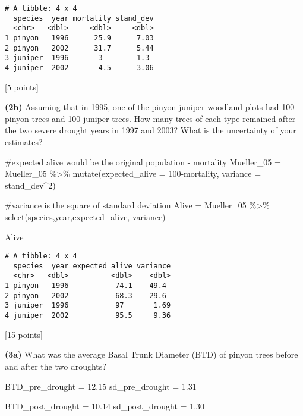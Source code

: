 \documentclass[
  letterpaper,
  DIV=11,
  numbers=noendperiod]{scrartcl}
\newenvironment{Shaded}{\begin{snugshade}}{\end{snugshade}}
\newcommand{\AttributeTok}[1]{\textcolor[rgb]{0.40,0.45,0.13}{#1}}
\newcommand{\CommentTok}[1]{\textcolor[rgb]{0.37,0.37,0.37}{#1}}
\newcommand{\DecValTok}[1]{\textcolor[rgb]{0.68,0.00,0.00}{#1}}
\newcommand{\FloatTok}[1]{\textcolor[rgb]{0.68,0.00,0.00}{#1}}
\newcommand{\FunctionTok}[1]{\textcolor[rgb]{0.28,0.35,0.67}{#1}}
\newcommand{\NormalTok}[1]{\textcolor[rgb]{0.00,0.23,0.31}{#1}}
\newcommand{\OtherTok}[1]{\textcolor[rgb]{0.00,0.23,0.31}{#1}}
\newcommand{\SpecialCharTok}[1]{\textcolor[rgb]{0.37,0.37,0.37}{#1}}
\begin{document}
\begin{verbatim}
# A tibble: 4 x 4
  species  year mortality stand_dev
  <chr>   <dbl>     <dbl>     <dbl>
1 pinyon   1996      25.9      7.03
2 pinyon   2002      31.7      5.44
3 juniper  1996       3        1.3 
4 juniper  2002       4.5      3.06
\end{verbatim}

{[}5 points{]}

\textbf{(2b)} Assuming that in 1995, one of the pinyon-juniper woodland
plots had 100 pinyon trees and 100 juniper trees. How many trees of each
type remained after the two severe drought years in 1997 and 2003? What
is the uncertainty of your estimates?

\begin{Shaded}
\begin{Highlighting}[]
\CommentTok{\#expected alive would be the original population {-} mortality}
\NormalTok{Mueller\_05 }\OtherTok{=}\NormalTok{ Mueller\_05 }\SpecialCharTok{\%\textgreater{}\%} 
  \FunctionTok{mutate}\NormalTok{(}\AttributeTok{expected\_alive =} \DecValTok{100}\SpecialCharTok{{-}}\NormalTok{mortality,}
         \AttributeTok{variance =}\NormalTok{ stand\_dev}\SpecialCharTok{\^{}}\DecValTok{2}\NormalTok{)}

\CommentTok{\#variance is the square of standard deviation}
\NormalTok{Alive }\OtherTok{=}\NormalTok{ Mueller\_05 }\SpecialCharTok{\%\textgreater{}\%} 
  \FunctionTok{select}\NormalTok{(species,year,expected\_alive, variance)}

\NormalTok{Alive}
\end{Highlighting}
\end{Shaded}

\begin{verbatim}
# A tibble: 4 x 4
  species  year expected_alive variance
  <chr>   <dbl>          <dbl>    <dbl>
1 pinyon   1996           74.1    49.4 
2 pinyon   2002           68.3    29.6 
3 juniper  1996           97       1.69
4 juniper  2002           95.5     9.36
\end{verbatim}

{[}15 points{]}

\textbf{(3a)} What was the average Basal Trunk Diameter (BTD) of pinyon
trees before and after the two droughts?

\begin{Shaded}
\begin{Highlighting}[]
\NormalTok{BTD\_pre\_drought }\OtherTok{=} \FloatTok{12.15}
\NormalTok{sd\_pre\_drought }\OtherTok{=} \FloatTok{1.31}

\NormalTok{BTD\_post\_drought }\OtherTok{=} \FloatTok{10.14}
\NormalTok{sd\_post\_drought }\OtherTok{=} \FloatTok{1.30}
\end{Highlighting}
\end{Shaded}
\end{document}

